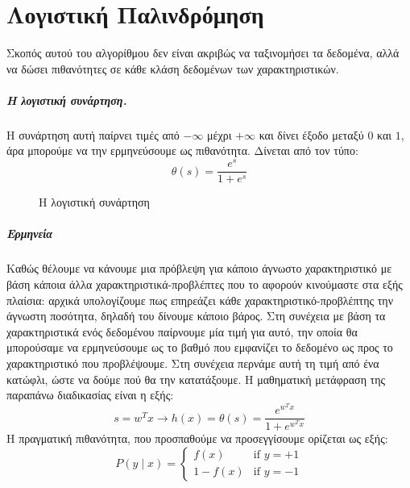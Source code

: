 \chapter{Λογιστική Παλινδρόμηση}
\label{appendix:LReg}
Σκοπός αυτού του αλγορίθμου δεν είναι ακριβώς να ταξινομήσει τα δεδομένα, αλλά να δώσει πιθανότητες σε κάθε κλάση δεδομένων των χαρακτηριστικών.
\paragraph{Η λογιστική συνάρτηση.} Η συνάρτηση αυτή παίρνει τιμές από $- \infty$ μέχρι $+ \infty$ και δίνει έξοδο μεταξύ $0$ και $1$, άρα μπορούμε να την ερμηνεύσουμε ως πιθανότητα. Δίνεται από τον τύπο:
\begin{equation}
\theta(s)=\frac{e^s}{1 + e^s}
\end{equation}
\begin{figure}[H]
	\centering			
	\caption[Η λογιστική συνάρτηση]{Η λογιστική συνάρτηση}
\end{figure}

\paragraph{Ερμηνεία} Καθώς θέλουμε να κάνουμε μια πρόβλεψη για κάποιο άγνωστο χαρακτηριστικό με βάση κάποια άλλα χαρακτηριστικά-προβλέπτες που το αφορούν κινούμαστε στα εξής πλαίσια: αρχικά υπολογίζουμε πως επηρεάζει κάθε χαρακτηριστικό-προβλέπτης την άγνωστη ποσότητα, δηλαδή του δίνουμε κάποιο βάρος. Στη συνέχεια με βάση τα χαρακτηριστικά ενός δεδομένου παίρνουμε μία τιμή
για αυτό, την οποία θα μπορούσαμε να ερμηνεύσουμε ως το βαθμό που εμφανίζει το δεδομένο ως προς το χαρακτηριστικό που προβλέψουμε. Στη συνέχεια περνάμε αυτή τη τιμή  από ένα κατώφλι, ώστε να δούμε πού θα την κατατάξουμε. Η μαθηματική μετάφραση της παραπάνω διαδικασίας είναι η εξής:
\begin{equation}
s=w^T x \rightarrow h(x)=\theta(s)=\frac{e^{w^T x}}{1 + e^{w^T x} }\end{equation}
Η πραγματική πιθανότητα, που προσπαθούμε να προσεγγίσουμε  ορίζεται ως εξής:
\begin{equation}
P(y \mid x)=\left\{
\begin{array}{ll}
f(x)  & \mbox{if } y = +1 \\
1 - f(x)  & \mbox{if } y = -1
\end{array}
\right.
\end{equation}

